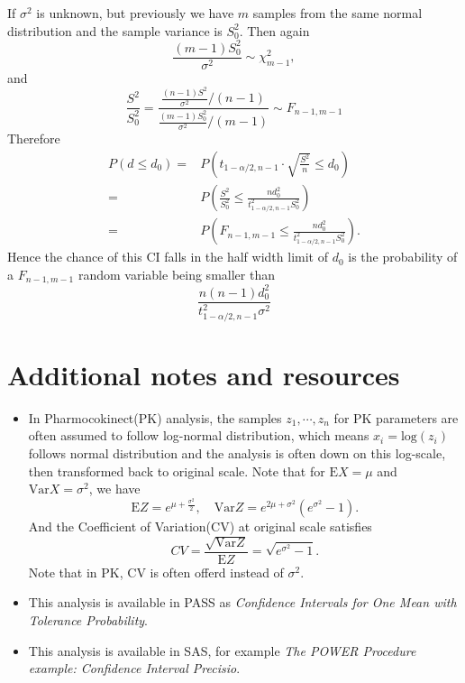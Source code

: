 \documentclass[a4paper,12pt]{article}
\begin{document}
If $\sigma^2$ is unknown, but previously we have $m$ samples from the same normal distribution and the sample variance is $S_0^2$. Then again
\[
  \frac{\left(m - 1\right)S_0^2}{\sigma^2}\sim \chi^2_{m - 1}
  ,
\]
and
\[
  \frac{S^2}{S_0^2} =
  \frac{
    \frac{\left(n - 1\right)S^2}{\sigma^2} / \left(n - 1\right)
  }{
    \frac{\left(m - 1\right)S_0^2}{\sigma^2} / \left(m - 1\right)
  } \sim F_{n - 1, m - 1}
\]
Therefore
\[
  \begin{aligned}
    P\left(
      d \leq d_0
    \right)
    =& P\left(
      t_{1 - \alpha / 2, n - 1}
      \cdot \sqrt{\frac{S^2}{n}}
      \leq d_0
    \right)    \\
    =& P\left(
      \frac{S^2}{S_0^2}
      \leq \frac{
        nd_0^2
      }{
        t_{1 - \alpha / 2, n - 1}^2
        S_0^2
      }
    \right)    \\
    =& P\left(
      F_{n - 1, m - 1} \leq
      \frac{
        nd_0^2
      }{
        t_{1 - \alpha / 2, n - 1}^2
        S_0^2
      }
    \right)
    .
  \end{aligned}  
\]
Hence the chance of this CI falls in the half width limit of $d_0$ is the probability of a $F_{n - 1, m - 1}$ random variable being smaller than
\[
  \frac{
    n\left(n - 1\right)d_0^2
  }{
    t_{1 - \alpha / 2, n - 1}^2
    \sigma^2
  }  
\]

\section{Additional notes and resources}
\label{sec:addit-notes-reso}


\begin{itemize}
\item In Pharmocokinect(PK) analysis, the samples $z_1, \cdots, z_n$ for PK parameters are often assumed to follow log-normal distribution, which means $x_i = \mathrm{log}\left(z_i\right)$ follows normal distribution and the analysis is often down on this log-scale, then transformed back to original scale. Note that for $\mathrm{E}X = \mu$ and $\mathrm{Var}X = \sigma^2$, we have
  \[
    \mathrm{E}Z = e^{\mu + \frac{\sigma^2}{2}}
    ,\quad
    \mathrm{Var}Z = e^{2\mu + \sigma^2}\left(e^{\sigma^2} - 1\right)
    .
  \]
  And the Coefficient of Variation(CV) at original scale satisfies
  \[
    CV = \frac{\sqrt{\mathrm{Var}Z}}{\mathrm{E}Z} =
    \sqrt{
      e^{\sigma^2} - 1
    }
    .
  \]
  Note that in PK, CV is often offerd instead of $\sigma^2$.
\item This analysis is available in PASS as \emph{Confidence Intervals for One Mean with Tolerance Probability}.
\item This analysis is available in SAS, for example \emph{The POWER Procedure example: Confidence Interval Precisio}.
\end{itemize}
\end{document}

